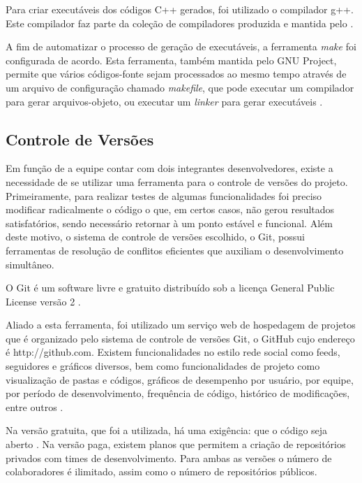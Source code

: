 Para criar executáveis dos códigos C++ gerados, foi utilizado o compilador g++. Este compilador faz parte da coleção de compiladores  \cite{gccabout} produzida e mantida pelo  \cite{gnuabout}.

A fim de automatizar o processo de geração de executáveis, a ferramenta \emph{make} foi configurada de acordo. Esta ferramenta, também mantida pelo GNU Project, permite que vários códigos-fonte sejam processados ao mesmo tempo através de um arquivo de configuração chamado \emph{makefile}, que pode executar um compilador para gerar arquivos-objeto, ou executar um \emph{linker} para gerar executáveis \cite{makeabout}.
 
\subsection{Controle de Versões}

Em função de a equipe contar com dois integrantes desenvolvedores, existe a necessidade de se utilizar uma ferramenta para o controle de versões do projeto. Primeiramente, para realizar testes de algumas funcionalidades foi preciso modificar radicalmente o código o que, em certos casos, não gerou resultados satisfatórios, sendo necessário retornar à um ponto estável e funcional. Além deste motivo, o sistema de controle de versões escolhido, o Git, possui ferramentas de resolução de conflitos eficientes que auxiliam o desenvolvimento simultâneo.

O Git é um software livre e gratuito distribuído sob a licença  General Public License versão 2 \cite{git}.

Aliado a esta ferramenta, foi utilizado um serviço web de hospedagem de projetos que é organizado pelo sistema de controle de versões Git, o GitHub cujo endereço é http://github.com. Existem funcionalidades no estilo rede social como feeds, seguidores e gráficos diversos, bem como funcionalidades de projeto como visualização de pastas e códigos, gráficos de desempenho por usuário, por equipe, por período de desenvolvimento, frequência de código, histórico de modificações, entre outros \cite{githubabout}.

Na versão gratuita, que foi a utilizada, há uma exigência: que o código seja aberto \cite{githubabout}. Na versão paga, existem planos que permitem a criação de repositórios privados com times de desenvolvimento. Para ambas as versões o número de colaboradores é ilimitado, assim como o número de repositórios públicos.

